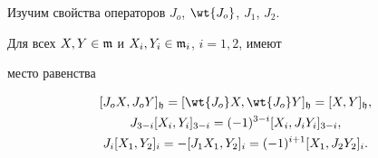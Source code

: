 Изучим свойства операторов $J_o$, $\wt{J_o}$, $J_1$, $J_2$.





\begin{thm}


Для всех $X,Y\in \frak{m}$ и $X_i,Y_i \in \frak{m}_i$, $i=1,2$, имеют


место равенства


\begin{gather}\label{15}


[J_oX,J_oY]_{\frak{h}}=[\wt{J_o}X,\wt{J_o}Y]_{\frak{h}}=[X,Y]_{\frak{h}},\\


%


\label{16}


J_{3-i}[X_i,Y_i]_{3-i}=(-1)^{3-i}[X_i,J_iY_i]_{3-i}, \\


%


\label{17}


J_i[X_1,Y_2]_i=-[J_1X_1,Y_2]_i=(-1)^{i+1}[X_1,J_2Y_2]_i.


\end{gather}


\end{thm}






